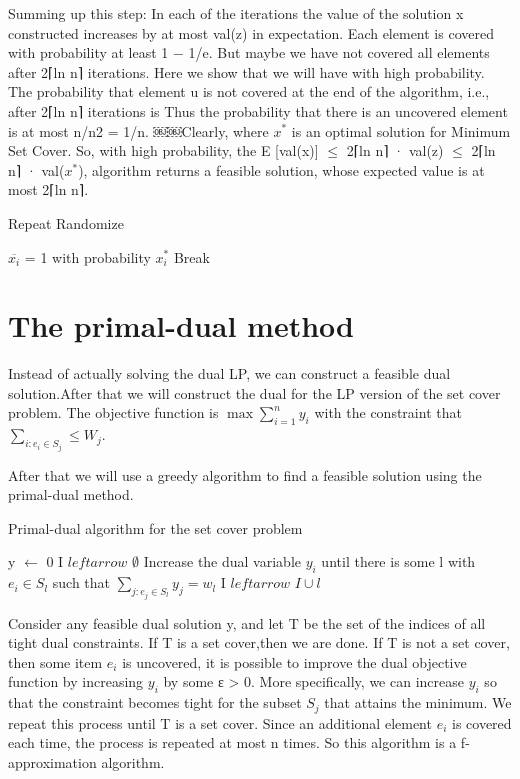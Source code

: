 \documentclass[usletter]{article}
\begin{document}
Summing up this step: In each of the iterations the value of the solution x constructed increases by at most val(z) in expectation. Each element is covered with probability at least 1 − 1/e. But maybe we have not covered all elements after 2⌈ln n⌉ iterations. Here we show that we will have with high probability.
The probability that element u is not covered at the end of the algorithm, i.e., after
2⌈ln n⌉ iterations is
Thus the probability that there is an uncovered element is at most n/n2 = 1/n.
￼￼Clearly, where $x^*$ is an optimal solution for Minimum Set Cover. So, with high probability, the
E [val(x)] $\le$ 2⌈ln n⌉ · val(z) $\le$ 2⌈ln n⌉ · val($x^*$),
algorithm returns a feasible solution, whose expected value is at most 2⌈ln n⌉.

\begin{algorithm}
\caption{Repeat Randomize}
\begin{algorithmic}[1]
	\State $\overline{x_i}$ = 1 with probability $x_i^*$
		\State Break
	\EndIf
\EndFor
\EndProcedure
\end{algorithmic}
\end{algorithm}

\section{The primal-dual method}
Instead of actually solving the dual LP, we can construct a feasible dual solution.After that we will construct the dual for the LP version of the set cover problem. The objective function is $\max{\sum_{i=1}^{n}{y_i}}$ with the constraint that $\sum_{i: e_i \in S_j} \le W_j$.

After that we will use a greedy algorithm to find  a feasible solution using the primal-dual method.

\begin{algorithm}
\caption{Primal-dual algorithm for the set cover problem}
\begin{algorithmic}[2]
\State y $\leftarrow$ 0
\State I $leftarrow$ $\emptyset$
	\State Increase the dual variable $y_i$ until there is some l with $e_i \in S_l$ such that
		$\sum_{j: e_j \in S_l}{y_j} = w_l$
	\State I $leftarrow$ $I \cup {l}$
\EndWhile
\end{algorithmic}
\end{algorithm}

Consider any feasible dual solution y, and let T be the set of the indices of all tight dual constraints. If T is a set cover,then we are done. If T is not a set cover, then some item $e_i$ is uncovered, it is possible to improve the dual objective function by increasing $y_i$ by some ε > 0. More specifically, we can increase $y_i$ so that the constraint becomes tight for the subset $S_j$ that attains the minimum.  We repeat this process until T is a set cover. Since an additional element $e_i$ is covered each time, the process is repeated at most n times. So this algorithm is a f-approximation algorithm.



\end{document}
